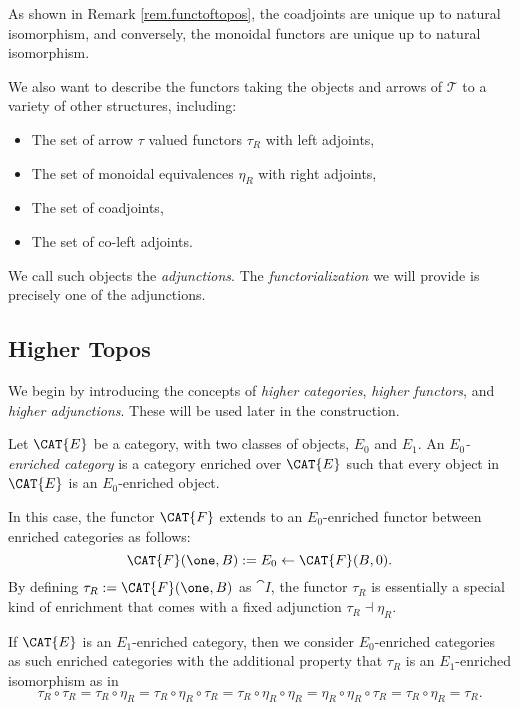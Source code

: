 \documentclass[a4paper,reqno,oneside]{article}
\begin{document}
As shown in Remark \ref{rem.functoftopos}, the coadjoints are unique up to natural isomorphism, 
and conversely, the monoidal functors are unique up to natural isomorphism. 

We also want to describe the functors taking the objects and arrows of $\mathcal{T}$ to a variety of other structures, including: 

\begin{itemize}
\item The set of arrow $\tau$ valued functors $\tau_R$ with left adjoints, 
\item The set of monoidal equivalences $\eta_R$ with right adjoints, 
\item The set of coadjoints, 
\item The set of co-left adjoints.
\end{itemize}
We call such objects the \emph{adjunctions}. The \emph{functorialization} we will provide is precisely 
one of the adjunctions.


\subsection{Higher Topos}
We begin by introducing the concepts of \emph{higher categories}, 
\emph{higher functors}, and \emph{higher adjunctions}. These will be used later in the construction.

\begin{definition}
Let $\CAT{E}$ be a category, with two classes of objects, $E_0$ and $E_1$. An \emph{$E_0$-enriched category} is a category enriched over $\CAT{E}$
such that every object in $\CAT{E}$ is an $E_0$-enriched object. 
\end{definition}

In this case, the functor $\CAT{F}$ extends to an $E_0$-enriched functor between enriched categories as follows:
$$\CAT{F}(\one,B) := E_{0} \leftarrow \CAT{F} (B,0).$$
By defining $\tau_R := \CAT{F}(\one,B)$ as $\cat{I}$, the functor $\tau_R$ is essentially a special kind of enrichment that comes with a fixed adjunction $\tau_R \dashv \eta_R$. 

If $\CAT{E}$ is an $E_1$-enriched category, then we consider $E_0$-enriched categories as such enriched 
categories with the additional property that $\tau_R$ is an $E_1$-enriched isomorphism as in 
\begin{equation}\label{eqn.enrichedisomorphism1}
\tau_R \circ \tau_R = \tau_R \circ \eta_R = 
\tau_R \circ \eta_R \circ \tau_R = \tau_R \circ \eta_R \circ \eta_R = \eta_R \circ \eta_R \circ \tau_R = \tau_R \circ \eta_R = \tau_R.
\end{equation}
\end{document}
